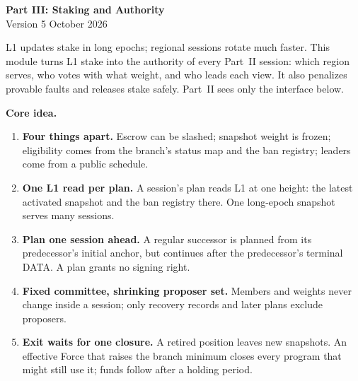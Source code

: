 \documentclass[11pt,a4paper]{article}
\begin{document}
\begin{center}
{\Large\bfseries Part III: Staking and Authority}\\[3pt]
{\small Version 5  October 2026}
\end{center}

L1 updates stake in long epochs; regional sessions rotate much faster.
This module turns L1 stake into the authority of every Part~II session:
which region serves, who votes with what weight, and who leads each view.
It also penalizes provable faults and releases stake safely. Part~II sees
only the interface below.

\begin{mdframed}[linewidth=.6pt,innertopmargin=5pt,innerbottommargin=5pt]
\textbf{Core idea.}
\begin{enumerate}[label=\textbf{\arabic*.},itemsep=2pt]
\item \textbf{Four things apart.} Escrow can be slashed; snapshot weight
is frozen; eligibility comes from the branch's status map and the ban
registry; leaders come from a public schedule.
\item \textbf{One L1 read per plan.} A session's plan reads L1 at one
height: the latest activated snapshot and the ban registry there. One
long-epoch snapshot serves many sessions.
\item \textbf{Plan one session ahead.} A regular successor is planned
from its predecessor's initial anchor, but continues after the
predecessor's terminal DATA. A plan grants no signing right.
\item \textbf{Fixed committee, shrinking proposer set.} Members and
weights never change inside a session; only recovery records and later
plans exclude proposers.
\item \textbf{Exit waits for one closure.} A retired position leaves new
snapshots. An effective Force that raises the branch minimum closes every
program that might still use it; funds follow after a holding period.
\end{enumerate}
\end{mdframed}
\end{document}
